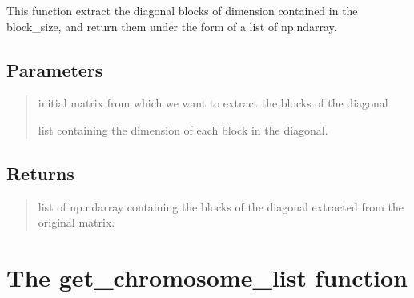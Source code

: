 \documentclass[letterpaper,10pt,english]{sphinxmanual}
\begin{document}
\begin{fulllineitems}
\label{\detokenize{index:hicanalysis.preprocessing.extract_diagonal_blocks}}
\pysigstartsignatures
{}
\pysigstopsignatures
\sphinxAtStartPar
This function extract the diagonal blocks of dimension contained in the 
block\_size, and return them under the form of a list of np.ndarray.


\subsection{Parameters}
\label{\detokenize{index:id3}}\begin{quote}
\begin{description}
\sphinxAtStartPar
initial matrix from which we want to extract the blocks of the diagonal

\sphinxAtStartPar
list containing the dimension of each block in the diagonal.

\end{description}
\end{quote}


\subsection{Returns}
\label{\detokenize{index:id4}}\begin{quote}
\begin{description}
\sphinxAtStartPar
list of np.ndarray containing the blocks of the diagonal extracted from the original matrix.

\end{description}
\end{quote}

\end{fulllineitems}



\section{The get\_chromosome\_list function}
\label{\detokenize{index:the-get-chromosome-list-function}}
\end{document}

